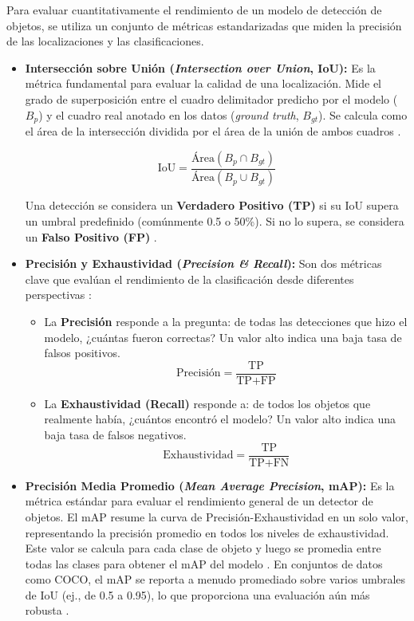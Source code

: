 Para evaluar cuantitativamente el rendimiento de un modelo de detección de objetos, se utiliza un conjunto de métricas estandarizadas que miden la precisión de las localizaciones y las clasificaciones.

\begin{itemize}
    \item \textbf{Intersección sobre Unión (\textit{Intersection over Union}, IoU):} Es la métrica fundamental para evaluar la calidad de una localización. Mide el grado de superposición entre el cuadro delimitador predicho por el modelo ($B_p$) y el cuadro real anotado en los datos (\textit{ground truth}, $B_{gt}$). Se calcula como el área de la intersección dividida por el área de la unión de ambos cuadros \cite{google2024iou}.
    
    $$ \text{IoU} = \frac{\text{Área}(B_p \cap B_{gt})}{\text{Área}(B_p \cup B_{gt})} $$
    
    Una detección se considera un \textbf{Verdadero Positivo (TP)} si su IoU supera un umbral predefinido (comúnmente 0.5 o 50\%). Si no lo supera, se considera un \textbf{Falso Positivo (FP)} \cite{terven2023yolo}.

    \item \textbf{Precisión y Exhaustividad (\textit{Precision \& Recall}):} Son dos métricas clave que evalúan el rendimiento de la clasificación desde diferentes perspectivas \cite{google2024pr}:
    \begin{itemize}
        \item La \textbf{Precisión} responde a la pregunta: de todas las detecciones que hizo el modelo, ¿cuántas fueron correctas? Un valor alto indica una baja tasa de falsos positivos.
        $$ \text{Precisión} = \frac{\text{TP}}{\text{TP} + \text{FP}} $$
        \item La \textbf{Exhaustividad (Recall)} responde a: de todos los objetos que realmente había, ¿cuántos encontró el modelo? Un valor alto indica una baja tasa de falsos negativos.
        $$ \text{Exhaustividad} = \frac{\text{TP}}{\text{TP} + \text{FN}} $$
    \end{itemize}
    
    \item \textbf{Precisión Media Promedio (\textit{Mean Average Precision}, mAP):} Es la métrica estándar para evaluar el rendimiento general de un detector de objetos. El mAP resume la curva de Precisión-Exhaustividad en un solo valor, representando la precisión promedio en todos los niveles de exhaustividad. Este valor se calcula para cada clase de objeto y luego se promedia entre todas las clases para obtener el mAP del modelo \cite{sapkota2025yolo}. En conjuntos de datos como COCO, el mAP se reporta a menudo promediado sobre varios umbrales de IoU (ej., de 0.5 a 0.95), lo que proporciona una evaluación aún más robusta \cite{terven2023yolo}.


\end{itemize}
